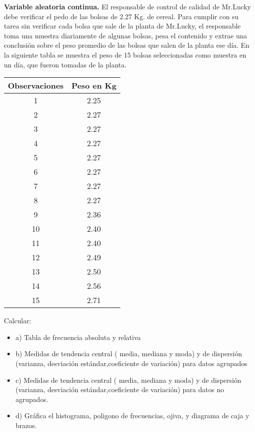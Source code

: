 \documentclass{oxmathproblems}
\begin{document}
\begin{questions}

\miquestion \textbf{Variable aleatoria continua.}
El responsable de control de calidad de Mr.Lucky debe verificar el pedo de las bolsas de 2.27 Kg. de cereal. Para cumplir con su tarea sin verificar cada bolsa que sale de la planta de Mr.Lucky, el responsable toma una muestra diariamente de algunas bolsas, pesa el contenido y extrae una conclusión sobre el peso promedio de las bolsas que salen de la planta ese día. 
En la siguiente tabla se muestra el peso de 15 bolsas seleccionadas como muestra en un día, que fueron tomadas de la planta. 
\begin{center}
\begin{tabular}{ |c|c| } 
 \hline
 \textbf{Observaciones} & \textbf{Peso en Kg} \\ 
 \hline
 1 & 2.25 \\
 2  & 2.27 \\
 3 & 2.27\\ 
 4 & 2.27 \\ 
 5 & 2.27 \\ 
 6 & 2.27 \\ 
 7 & 2.27\\ 
 8 & 2.27 \\ 
 9 & 2.36 \\ 
 10 & 2.40 \\ 
11 & 2.40 \\ 
12 & 2.49 \\
13 & 2.50 \\ 
14 & 2.56 \\ 
15 & 2.71 \\ 
 \hline
\end{tabular}
\end{center}

Calcular: 

\begin{itemize}
\item  a) Tabla de frecuencia absoluta y relativa 
\item  b) Medidas de tendencia central ( media, mediana y moda) y de dispersión (varianza, desviación estándar,coeficiente de variación) para datos agrupados
\item  c) Medidas de tendencia central ( media, mediana y moda) y de dispersión (varianza, desviación estándar,coeficiente de variación) para datos no agrupados. 
\item d) Gráfica el histograma, poligono de frecuencias, ojiva, y  diagrama de caja y brazos. 
\end{itemize}



\end{questions}
\end{document}
